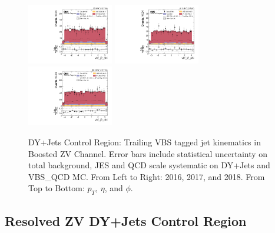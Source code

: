 \begin{figure}[!ht]
  \includegraphics[width=0.335\textwidth]{analysis_plots/2016_zv/cr_vjets_l/vbf_j2_phi.pdf} \hspace{-10pt}
  \includegraphics[width=0.335\textwidth]{analysis_plots/2017_zv/cr_vjets_l/vbf_j2_phi.pdf} \hspace{-10pt}
  \includegraphics[width=0.335\textwidth]{analysis_plots/2018_zv/cr_vjets_l/vbf_j2_phi.pdf} \hspace{-10pt} \\
  \caption[DY+Jets Control Region: Trailing VBS tagged jet kinematics in Boosted ZV Channel]%
  {DY+Jets Control Region: Trailing VBS tagged jet kinematics in Boosted ZV Channel.
    Error bars include statistical uncertainty on total background,
    JES and QCD scale systematic on DY+Jets and VBS\_QCD MC\@. From Left to Right: 2016,
    2017, and 2018. From Top to Bottom: \( p_T \), \( \eta \), and \( \phi \).}%
  \label{fig:zv-cr-vjets-l-vbs2-pt-eta-m}
\end{figure}

\clearpage
\subsection{
  Resolved ZV DY+Jets Control Region
}\label{ch_vbs:resolved-plots}

